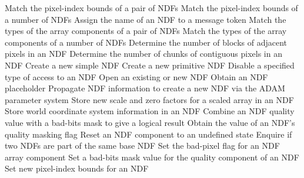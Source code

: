 \begin{latexonly}
            {Match the pixel-index bounds of a pair of NDFs}
            {Match the pixel-index bounds of a number of NDFs}
            {Assign the name of an NDF to a message token}
            {Match the types of the array components of a pair of NDFs}
            {Match the types of the array components of a number of NDFs}
            {Determine the number of blocks of adjacent pixels in an NDF}
            {Determine the number of chunks of contiguous pixels in an NDF}
            {Create a new simple NDF}
            {Create a new primitive NDF}
            {Disable a specified type of access to an NDF}
            {Open an existing or new NDF}
            {Obtain an NDF placeholder}
            {Propagate NDF information to create a new NDF via the ADAM parameter system}
            {Store new scale and zero factors for a scaled array in an NDF}
            {Store world coordinate system information in an NDF}
            {Combine an NDF quality value with a bad-bits mask to give a logical result}
            {Obtain the value of an NDF's quality masking flag}
            {Reset an NDF component to an undefined state}
            {Enquire if two NDFs are part of the same base NDF}
            {Set the bad-pixel flag for an NDF array component}
            {Set a bad-bits mask value for the quality component of an NDF}
            {Set new pixel-index bounds for an NDF}

\end{latexonly}
